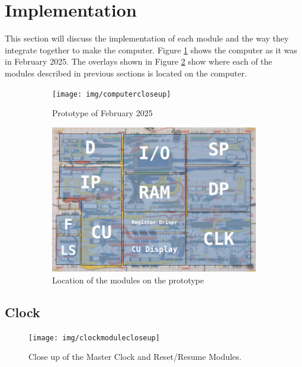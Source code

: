 \section{Implementation} \label{sec:implementation}
This section will discuss the implementation of each module and the way they integrate together to make the computer. Figure \ref{fig:prototypea} shows the computer as it was in February 2025. The overlays shown in Figure \ref{fig:prototypeb} show where each of the modules described in previous sections is located on the computer.

\begin{figure}[H]
  \centering
  \begin{subfigure}{0.9\linewidth}
    \centering
    \texttt{[image: img/computercloseup]}
    \caption{Prototype of February 2025}
    \label{fig:prototypea}
  \end{subfigure}
  \vspace{\baselineskip}
  \begin{subfigure}{0.9\linewidth}
    \centering
    \includegraphics[width=0.8\linewidth]{img/computerparts}
    \caption{Location of the modules on the prototype}
    \label{fig:prototypeb}
  \end{subfigure}
  \caption{}
  \label{fig:prototype}
\end{figure}


\subsection{Clock} \label{sec:clock}
\begin{figure}[H]
  \centering
  \texttt{[image: img/clockmodulecloseup]}
  \caption{Close up of the Master Clock and Reset/Resume Modules.}
  \label{fig:masterclockcloseup}
\end{figure}


